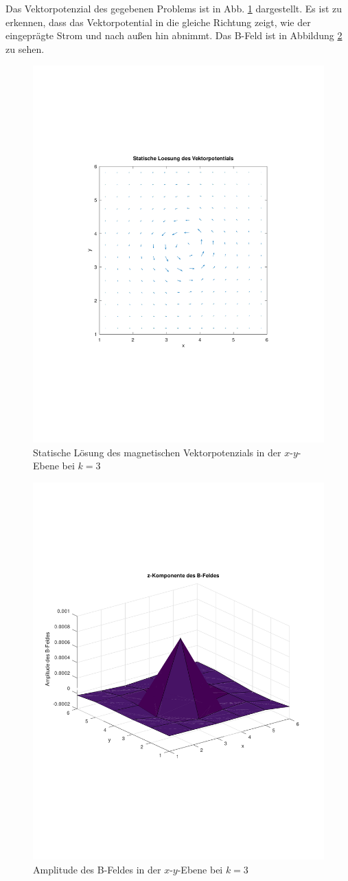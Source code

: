 \documentclass[Protokollheft.tex]{subfiles}
\begin{document}
\noindent
Das Vektorpotenzial des gegebenen Problems ist in Abb. \ref{fig:statischeloesungdesvektorpotenzials} dargestellt. Es ist zu erkennen, dass das Vektorpotential in die gleiche Richtung zeigt, wie der eingeprägte Strom und nach außen hin abnimmt. Das B-Feld ist in Abbildung \ref{fig:b_feld} zu sehen.
\begin{figure}
	\centering
	\includegraphics[trim = 15mm 65mm 15mm 65mm, clip,width=0.7\linewidth]{StatischeLoesungdesVektorpotenzials.pdf}
	\caption{Statische Lösung des magnetischen Vektorpotenzials in der $x$-$y$-Ebene bei $k=3$}
	\label{fig:statischeloesungdesvektorpotenzials}
\end{figure}
\begin{figure}
	\centering
	\includegraphics[trim = 5mm 65mm 15mm 65mm, clip,width=0.7\linewidth]{b_feld.pdf}
	\caption{Amplitude des B-Feldes in der $x$-$y$-Ebene bei $k=3$}
	\label{fig:b_feld}
\end{figure}
\end{document}
